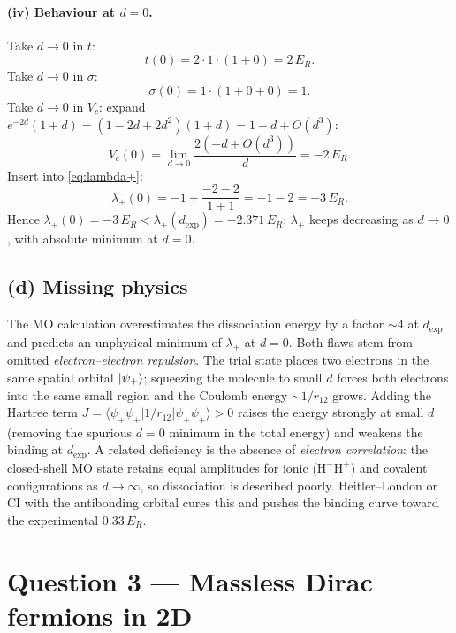 \documentclass[11pt]{article}
\begin{document}
\paragraph{(iv) Behaviour at $d=0$.} Take $d\to 0$ in $t$:
\begin{equation}
t(0)=2\cdot 1\cdot(1+0)=2\,E_R.
\end{equation}
Take $d\to 0$ in $\sigma$:
\begin{equation}
\sigma(0)=1\cdot(1+0+0)=1.
\end{equation}
Take $d\to 0$ in $V_c$: expand $e^{-2d}(1+d)=(1-2d+2d^2)(1+d)=1-d+O(d^3)$:
\begin{equation}
V_c(0)=\lim_{d\to0}\frac{2(-d+O(d^3))}{d}=-2\,E_R.
\end{equation}
Insert into \eqref{eq:lambda+}:
\begin{equation}
\lambda_+(0)=-1+\frac{-2-2}{1+1}=-1-2=-3\,E_R.
\label{eq:lp-zero}
\end{equation}
Hence $\lambda_+(0)=-3\,E_R<\lambda_+(d_{\mathrm{exp}})=-2.371\,E_R$: $\lambda_+$ keeps decreasing as $d\to 0$, with absolute minimum at $d=0$.

\subsection*{(d) Missing physics}

The MO calculation overestimates the dissociation energy by a factor $\sim 4$ at $d_{\mathrm{exp}}$ and predicts an unphysical minimum of $\lambda_+$ at $d=0$. Both flaws stem from omitted \emph{electron--electron repulsion}. The trial state places two electrons in the same spatial orbital $\ket{\psi_+}$; squeezing the molecule to small $d$ forces both electrons into the same small region and the Coulomb energy $\sim 1/r_{12}$ grows. Adding the Hartree term $J=\langle\psi_+\psi_+|1/r_{12}|\psi_+\psi_+\rangle>0$ raises the energy strongly at small $d$ (removing the spurious $d=0$ minimum in the total energy) and weakens the binding at $d_{\mathrm{exp}}$. A related deficiency is the absence of \emph{electron correlation}: the closed-shell MO state retains equal amplitudes for ionic ($\mathrm H^-\mathrm H^+$) and covalent configurations as $d\to\infty$, so dissociation is described poorly. Heitler--London or CI with the antibonding orbital cures this and pushes the binding curve toward the experimental $0.33\,E_R$.

\section*{Question 3 --- Massless Dirac fermions in 2D}
\end{document}
